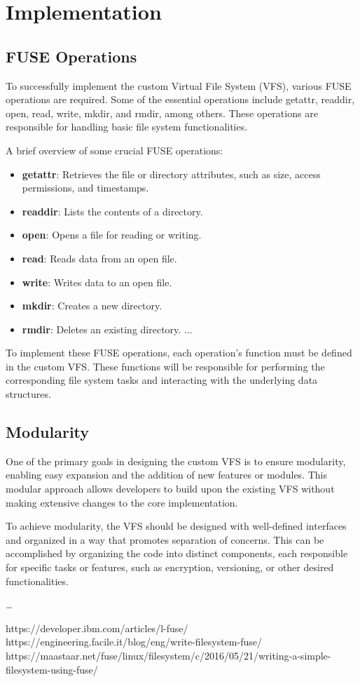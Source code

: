\chapter{Implementation}
\label{chap:implementation}

\section{FUSE Operations}\label{sec:fuse-ops}

To successfully implement the custom Virtual File System (VFS), various FUSE operations are required.
Some of the essential operations include getattr, readdir, open, read, write, mkdir, and rmdir, among others.
These operations are responsible for handling basic file system functionalities.

A brief overview of some crucial FUSE operations:

\begin{itemize}
\item \textbf{getattr}: Retrieves the file or directory attributes, such as size, access permissions, and timestamps.
\item \textbf{readdir}: Lists the contents of a directory.
\item \textbf{open}: Opens a file for reading or writing.
\item \textbf{read}: Reads data from an open file.
\item \textbf{write}: Writes data to an open file.
\item \textbf{mkdir}: Creates a new directory.
\item \textbf{rmdir}: Deletes an existing directory.
...
\end{itemize}

To implement these FUSE operations, each operation's function must be defined in the custom VFS.
These functions will be responsible for performing the corresponding file system tasks and interacting with the underlying data structures.

\section{Modularity}\label{sec:modularity}

One of the primary goals in designing the custom VFS is to ensure modularity, enabling easy expansion and the addition of new features or modules.
This modular approach allows developers to build upon the existing VFS without making extensive changes to the core implementation.

To achieve modularity, the VFS should be designed with well-defined interfaces and organized in a way that promotes separation of concerns.
This can be accomplished by organizing the code into distinct components, each responsible for specific tasks or features, such as encryption, versioning, or other desired functionalities.

\ldots

https://developer.ibm.com/articles/l-fuse/
https://engineering.facile.it/blog/eng/write-filesystem-fuse/
https://maastaar.net/fuse/linux/filesystem/c/2016/05/21/writing-a-simple-filesystem-using-fuse/
